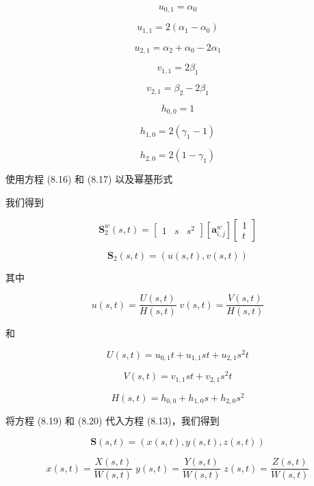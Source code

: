 \documentclass[../main.tex]{subfiles}
\begin{document}
\[
{u}_{0,1} = {\alpha }_{0}
\]

\[
{u}_{1,1} = 2\left( {{\alpha }_{1} - {\alpha }_{0}}\right)
\]

\[
{u}_{2,1} = {\alpha }_{2} + {\alpha }_{0} - 2{\alpha }_{1}
\]

\[
{v}_{1,1} = 2{\beta }_{1}
\]

\[
{v}_{2,1} = {\beta }_{2} - 2{\beta }_{1}
\]

\[
{h}_{0,0} = 1
\]

\[
{h}_{1,0} = 2\left( {{\gamma }_{1} - 1}\right)
\]

\[
{h}_{2,0} = 2\left( {1 - {\gamma }_{1}}\right)  \tag{8.17}
\]

使用方程 (8.16) 和 (8.17) 以及幂基形式

我们得到

\[
{\mathbf{S}}_{2}^{w}\left( {s,t}\right)  = \left\lbrack  \begin{array}{lll} 1 & s & {s}^{2} \end{array}\right\rbrack  \left\lbrack  {\mathbf{a}}_{i,j}^{w}\right\rbrack  \left\lbrack  \begin{array}{l} 1 \\  t \end{array}\right\rbrack   \tag{8.18}
\]

\[
{\mathbf{S}}_{2}\left( {s,t}\right)  = \left( {u\left( {s,t}\right) ,v\left( {s,t}\right) }\right)
\]

其中

\[
u\left( {s,t}\right)  = \frac{U\left( {s,t}\right) }{H\left( {s,t}\right) }\;v\left( {s,t}\right)  = \frac{V\left( {s,t}\right) }{H\left( {s,t}\right) } \tag{8.19}
\]

和

\[
U\left( {s,t}\right)  = {u}_{0,1}t + {u}_{1,1}{st} + {u}_{2,1}{s}^{2}t
\]

\[
V\left( {s,t}\right)  = {v}_{1,1}{st} + {v}_{2,1}{s}^{2}t
\]

\[
H\left( {s,t}\right)  = {h}_{0,0} + {h}_{1,0}s + {h}_{2,0}{s}^{2} \tag{8.20}
\]

将方程 (8.19) 和 (8.20) 代入方程 (8.13)，我们得到

\[
\mathbf{S}\left( {s,t}\right)  = \left( {x\left( {s,t}\right) ,y\left( {s,t}\right) ,z\left( {s,t}\right) }\right)  \tag{8.21}
\]

\[
x\left( {s,t}\right)  = \frac{X\left( {s,t}\right) }{W\left( {s,t}\right) }\;y\left( {s,t}\right)  = \frac{Y\left( {s,t}\right) }{W\left( {s,t}\right) }\;z\left( {s,t}\right)  = \frac{Z\left( {s,t}\right) }{W\left( {s,t}\right) } \tag{8.22}
\]
\end{document}
